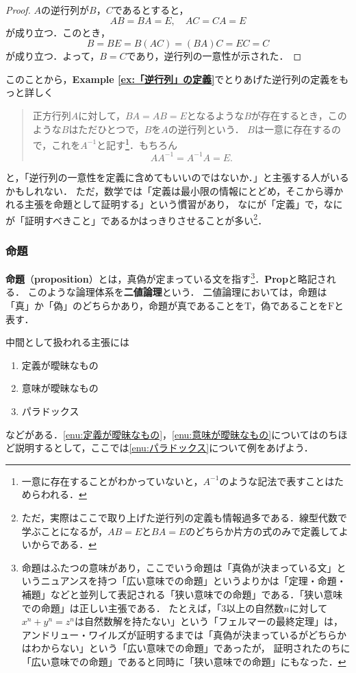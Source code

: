 \documentclass[a4paper,11pt]{ltjsarticle}
\renewcommand{\emph}[1]{\textbf{#1}}
\newenvironment{tleftbar}{\begin{tbleftline}\setlength{\parindent}{1\zw}}{\end{tbleftline}}
\newcommand{\exref}[1]{{\bfseries\sffamily Example \ref{ex:#1}}}
\begin{document}
\begin{tleftbar}
	\begin{proof}
	$A$の逆行列が$B$，$C$であるとすると，
	\[
		AB=BA=E,\quad AC=CA=E
	\]
	が成り立つ．このとき，
	\[
		B=BE=B(AC)=(BA)C=EC=C
	\]
	が成り立つ．よって，$B=C$であり，逆行列の一意性が示された．
	\end{proof}
\end{tleftbar}

このことから，\exref{「逆行列」の定義}でとりあげた逆行列の定義をもっと詳しく

\begin{quote}
	正方行列$A$に対して，$BA = AB =E$となるような$B$が存在するとき，このような$B$はただひとつで，$B$を$A$の逆行列という．
	$B$は一意に存在するので，これを$A^{-1}$と記す\footnote{一意に存在することがわかっていないと，$A^{-1}$のような記法で表すことはためらわれる．}．もちろん
	\[
		AA^{-1}=A^{-1}A=E.
	\]
\end{quote}
と，「逆行列の一意性を定義に含めてもいいのではないか．」と主張する人がいるかもしれない．
ただ，数学では「定義は最小限の情報にとどめ，そこから導かれる主張を命題として証明する」という慣習があり，
なにが「定義」で，なにが「証明すべきこと」であるかはっきりさせることが多い\footnote{ただ，実際はここで取り上げた逆行列の定義も情報過多である．線型代数で学ぶことになるが，$AB=E$と$BA=E$のどちらか片方の式のみで定義してよいからである．}．

\subsubsection{命題}

\emph{命題}（\emph{proposition}）とは，真偽が定まっている文を指す\footnote{命題はふたつの意味があり，ここでいう命題は「真偽が決まっている文」というニュアンスを持つ「広い意味での命題」というよりかは「定理・命題・補題」などと並列して表記される「狭い意味での命題」である．「狭い意味での命題」は正しい主張である．
	たとえば，「$3$以上の自然数$n$に対して$x^n + y^n =z^n$は自然数解を持たない」という「フェルマーの最終定理」は，
	アンドリュー・ワイルズが証明するまでは「真偽が決まっているがどちらかはわからない」という「広い意味での命題」であったが，
	証明されたのちに「広い意味での命題」であると同時に「狭い意味での命題」にもなった．}．\textbf{Prop}と略記される．
このような論理体系を\emph{二値論理}という．
二値論理においては，命題は「真」か「偽」のどちらかあり，命題が真であることを$\mathrm{T}$，偽であることを$\mathrm{F}$と表す．

中間として扱われる主張には
\begin{enumerate}[(1)]
	\item 定義が曖昧なもの \label{enu:定義が曖昧なもの}
	\item 意味が曖昧なもの \label{enu:意味が曖昧なもの}
	\item パラドックス \label{enu:パラドックス}
\end{enumerate}
などがある．\ref{enu:定義が曖昧なもの}，\ref{enu:意味が曖昧なもの}についてはのちほど説明するとして，ここでは\ref{enu:パラドックス}について例をあげよう．
\end{document}
